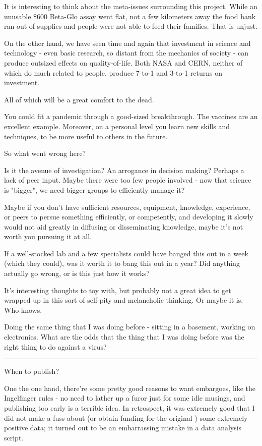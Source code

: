 \documentclass[paper.tex]{subfiles}
\begin{document}
It is interesting to think about the meta-issues surrounding this project. While an unusable \$600 Beta-Glo assay went flat, not a few kilometers away the food bank ran out of supplies and people were not able to feed their families. That is unjust. 

On the other hand, we have seen time and again that investment in science and technology - even basic research, so distant from the mechanics of society - can produce outsized effects on quality-of-life. Both NASA and CERN, neither of which do much related to people, produce 7-to-1 and 3-to-1 returns on investment. 

All of which will be a great comfort to the dead. 

You could fit a pandemic through a good-sized breakthrough. The vaccines are an excellent example. Moreover, on a personal level you learn new skills and techniques, to be more useful to others in the future.

So what went wrong here? 

Is it the avenue of investigation? An arrogance in decision making? Perhaps a lack of peer input. Maybe there were too few people involved - now that science is "bigger", we need bigger groups to efficiently manage it? 

Maybe if you don't have sufficient resources, equipment, knowledge, experience, or peers to persue something efficiently, or competently, and developing it slowly would not aid greatly in diffusing or disseminating knowledge, maybe it's not worth you pursuing it at all.

If a well-stocked lab and a few specialists could have banged this out in a week (which they could), was it worth it to bang this out in a year? Did anything actually go wrong, or is this just how it works?

It's interesting thoughts to toy with, but probably not a great idea to get wrapped up in this sort of self-pity and melancholic thinking. Or maybe it is. Who knows.

Doing the same thing that I was doing before - sitting in a basement, working on electronics. What are the odds that the thing that I was doing before was the right thing to do against a virus?

\rule{\linewidth}{0.2pt}

When to publish?

One the one hand, there're some pretty good reasons to want embargoes, like the Ingelfinger rules - no need to lather up a furor just for some idle musings, and publishing too early is a terrible idea. In retrospect, it was extremely good that I did not make a fuss about (or obtain funding for the original ) some extremely positive data; it turned out to be an embarrassing mistake in a data analysis script.
\end{document}
